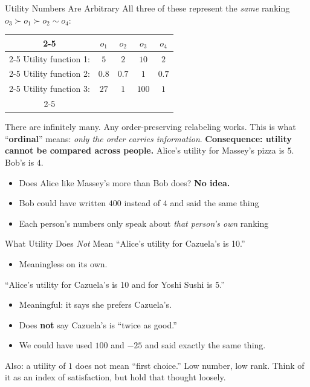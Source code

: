 \begin{frame}{Utility Numbers Are Arbitrary}
All three of these represent the \textit{same} ranking $o_3\succ o_1\succ o_2\sim o_4$:
\bsk
\centering
\begin{tabular}{c|c|c|c|c|}
\cline{2-5}
 & $o_1$ & $o_2$ & $o_3$ & $o_4$ \\
\cline{2-5}
Utility function 1: & $5$ & $2$ & $10$ & $2$ \\
\cline{2-5}
Utility function 2: & $0.8$ & $0.7$ & $1$ & $0.7$ \\
\cline{2-5}
Utility function 3: & $27$ & $1$ & $100$ & $1$ \\
\cline{2-5}
\end{tabular}
\bsk
\raggedright
There are infinitely many. Any order-preserving relabeling works.
\bsk
This is what ``\textbf{ordinal}'' means: \textit{only the order carries information}.
\vfill
\textbf{Consequence: utility cannot be compared across people.}
\bsk
Alice's utility for Massey's pizza is $5$. Bob's is $4$.
\begin{itemize}
    \item Does Alice like Massey's more than Bob does? \hspace{0.2in} \textbf{No idea.}
    \item Bob could have written $400$ instead of $4$ and said the same thing
    \item Each person's numbers only speak about \textit{that person's own} ranking
\end{itemize}
\vspace{-0.3in}
\end{frame}

\begin{frame}{What Utility Does \textit{Not} Mean}
``Alice's utility for Cazuela's is 10.''
\begin{itemize}
    \item Meaningless on its own.
\end{itemize}
\bsk
``Alice's utility for Cazuela's is 10 and for Yoshi Sushi is 5.''
\begin{itemize}
    \item Meaningful: it says she prefers Cazuela's.
    \item Does \textbf{not} say Cazuela's is ``twice as good.''
    \item We could have used $100$ and $-25$ and said exactly the same thing.
\end{itemize}
\vfill
Also: a utility of $1$ does not mean ``first choice.'' Low number, low rank.
\bsk
Think of it as an index of satisfaction, but hold that thought loosely.
\vspace{-0.4in}
\end{frame}

